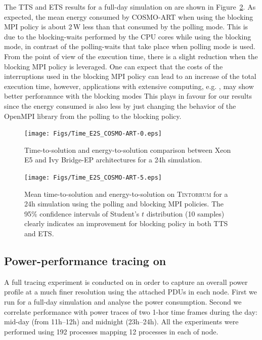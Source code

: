 The TTS and ETS results for a full-day simulation on \tinto are shown in Figure~\ref{fig:4}.  
As expected, the mean energy consumed by COSMO-ART when using the blocking MPI policy is about 
2\,W less than that consumed by the polling mode. This is due to the blocking-waits performed 
by the CPU cores while using the blocking mode, in contrast of the polling-waits that take 
place when polling mode is used. From the point of view of the execution time, there is a 
slight reduction when the blocking MPI policy is leveraged. One can expect that the costs of 
the interruptions used in the blocking MPI policy can lead to an increase of the total 
execution time, however, applications with extensive computing, e.g. \cosmoart, may show better perforamnce with the blocking modes This plays in favour for our results since the energy consumed is also less by just changing the behavior of the OpenMPI library from the polling to the blocking policy.

\begin{figure}[htbf]
  \texttt{[image: Figs/Time\_E2S\_COSMO-ART-0.eps]}
  \caption{Time-to-solution and energy-to-solution comparison between
    Xeon E5 and Ivy Bridge-EP architectures for a 24h simulation.}
  \label{fig:3}
\end{figure}

\begin{figure}[htbf]
  \texttt{[image: Figs/Time\_E2S\_COSMO-ART-5.eps]}
  \caption{Mean time-to-solution and energy-to-solution on
    \textsc{Tintorrum} for a 24h simulation using the polling and blocking MPI policies. The 95\% 
            confidence intervals of Student's $t$ distribution (10 samples) clearly indicates 
            an improvement for blocking policy in both TTS and ETS.}
  \label{fig:4}
\end{figure}

\subsection{Power-performance tracing on \tinto}
\label{subsec:4.3}

A full tracing experiment is conducted on \tinto in order to capture an overall power
profile at a much finer resolution using the attached PDUs in each node. First we run \cosmoart 
for a full-day simulation and analyse the power consumption. Second we correlate performance 
with power traces of two 1-hor time frames during the day: mid-day (from 11h--12h) and
midnight (23h--24h). All the experiments were performed using 192 \cosmoart processes
mapping 12 processes in each of node.


